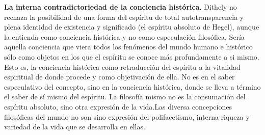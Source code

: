 \documentclass[a4paper, 11pt, twocolumn, spanish]{article}
\begin{document}
\textbf{La interna contradictoriedad de la conciencia histórica}. Dithely no
 rechaza la posibilidad de una forma del espíritu de total
 autotransparencia y plena identidad de existencia y significado (el
 espíritu absoluto de Hegel), aunque la entienda como conciencia
 histórica y no como especulación filosófica. Sería aquella conciencia
 que viera todos los fenómenos del mundo humano e histórico sólo como
 objetos en los que el espíritu se conoce más profundamente a si
 mismo. Esto es, la conciencia histórica como retraducción del
 espíritu a la vitalidad espiritual de donde procede y como
 objetivación de ella. No es en el saber especulativo del concepto,
 sino en la conciencia histórica, donde se lleva a término el saber de
 sí mismo del espíritu. La filosofía mismo no es la consumación del
 espíritu absoluto, sino otra expresión de la vida.Las diversa
 concepciones filosóficas del mundo no son sino expresión del
 polifacetismo, interna riqueza y variedad de la vida que se
 desarrolla en ellas.
\end{document}
